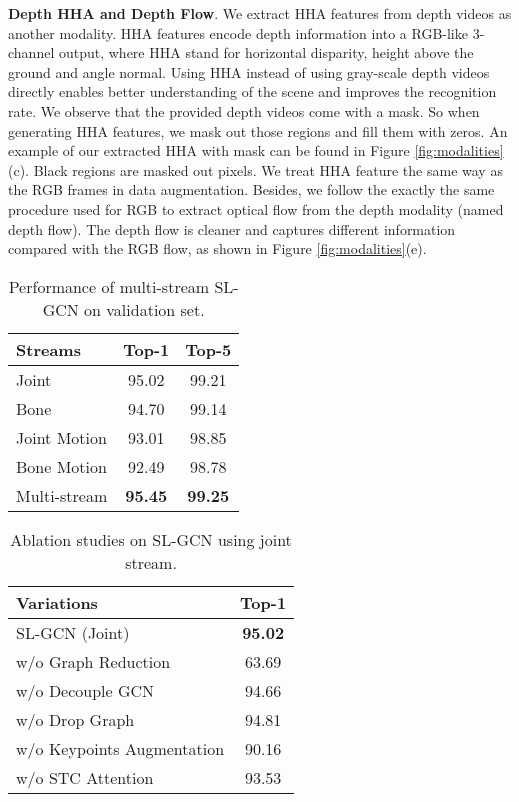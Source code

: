 \documentclass[final]{cvpr}
\begin{document}
\noindent\textbf{Depth HHA and Depth Flow}. 
We extract HHA features from depth videos as another modality. HHA features encode depth information into a RGB-like 3-channel output, where HHA stand for horizontal disparity, height above the ground and angle normal. 
Using HHA instead of using gray-scale depth videos directly enables better understanding of the scene and improves the recognition rate. We observe that the provided depth videos come with a mask. So when generating HHA features, we mask out those regions and fill them with zeros. An example of our extracted HHA with mask can be found in Figure \ref{fig:modalities}(c). Black regions are masked out pixels. We treat HHA feature the same way as the RGB frames in data augmentation. 
Besides, we follow the exactly the same procedure used for RGB to extract optical flow from the depth modality (named depth flow). The depth flow is cleaner and captures different information compared with the RGB flow, as shown in Figure \ref{fig:modalities}(e). 


\begin{table}
\begin{center}
\begin{tabular}{l | c | c}
\hline
Streams & Top-1 & Top-5 \\
\hline
\hline
Joint       & 95.02 & 99.21\\
Bone        & 94.70 & 99.14\\
Joint Motion& 93.01 & 98.85\\
Bone Motion & 92.49 & 98.78\\
\hline
Multi-stream &\textbf{95.45} & \textbf{99.25}\\
\hline
\end{tabular}
\end{center}\caption{Performance of multi-stream SL-GCN on validation set.}
\label{tab:validation_results_keypoints}
\end{table}

\begin{table}
\begin{center}
\begin{tabular}{l | c}
\hline
Variations & Top-1 \\
\hline
\hline
SL-GCN (Joint) & \textbf{95.02} \\
\hline
w/o Graph Reduction & 63.69\\
w/o Decouple GCN & 94.66\\
w/o Drop Graph & 94.81\\
w/o Keypoints Augmentation & 90.16\\
w/o STC Attention & 93.53\\
\hline
\end{tabular}
\end{center}\caption{Ablation studies on SL-GCN using joint stream.}
\label{tab:ablation_gcn}
\end{table}
\end{document}
